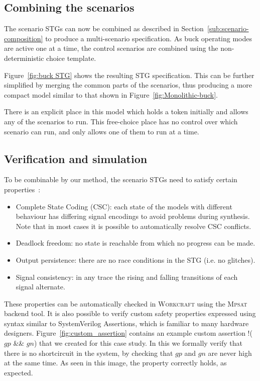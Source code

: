 \documentclass[british, journal]{IEEEtran}
\newcommand{\noun}[1]{\textsc{#1}}
\begin{document}
\subsection{Combining the scenarios }

The scenario STGs can now be combined as described in
Section~\ref{sub:scenario-composition}
to produce a multi-scenario specification. As buck operating modes are active
one at a
time, the control scenarios are combined using the non-deterministic choice
template.

Figure~\ref{fig:buck STG} shows the resulting STG specification. This can be
further simplified by merging the common parts of the scenarios, thus producing
a more compact model similar to that shown in Figure~\ref{fig:Monolithic-buck}.

There is an explicit place in this model which holds a token initially
and allows any of the scenarios to run. This free-choice place has no
control over which scenario can run, and only allows one of
them to run at a time.


\subsection{Verification and simulation}

To be combinable by our method, the scenario STGs need to satisfy certain
properties~\cite{Cortadella}:
\begin{itemize}
\item Complete State Coding (CSC): each state of the models with different
behaviour has differing signal encodings to avoid problems during
synthesis. Note that in most cases it is possible to automatically
resolve CSC conflicts.
\item Deadlock freedom: no state is reachable from which no progress can
be made.
\item Output persistence: there are no race conditions in the STG (i.e. no
glitches).
\item Signal consistency: in any trace the rising and falling transitions of
each signal alternate.
\end{itemize}
These properties can be automatically checked in \noun{Workcraft} using
the \noun{Mpsat}~\cite{khomenko2004detecting} backend tool.
It is also possible to verify custom safety properties expressed using
syntax similar to SystemVerilog Assertions, which is familiar to many
hardware designers.
Figure~\ref{fig:custom_assertion} contains an example custom assertion
\textsf{!($gp$ \&\& $gn$)} that we created for this case study.
In this we formally verify that there is no shortcircuit in the system, by
checking that $gp$ and $gn$ are never high at the same time.
As seen in this image, the property correctly holds, as expected.
\end{document}
